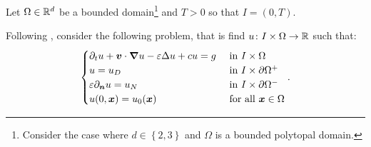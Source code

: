 Let $\Omega \in \mathbb{R}^{d}$ be a bounded domain\footnote{Consider the case where $d \in \left\{ 2, 3 \right\}$ and $\Omega$ is a bounded polytopal domain.} and $T > 0$ so that $I = \left( 0, T\right)$.

Following \cite{Feistauer2007}, consider the following problem, that is find $u \colon I \times \Omega \rightarrow \mathbb{R}$ such that:
\begin{gather}
    \begin{cases}
        \partial_t u + \bm{v} \cdot \bm{\nabla} u - \varepsilon \Delta u + c u = g & \text{ in } I \times \Omega \\
        u = u_D & \text{ in } I \times \partial \Omega^+ \\
        \varepsilon \partial_{\bm{n}} u = u_N & \text{ in } I \times \partial \Omega^- \\
        u(0, \bm{x}) = u_0(\bm{x}) & \text{ for all } \bm{x} \in \Omega
    \end{cases}.
\end{gather}